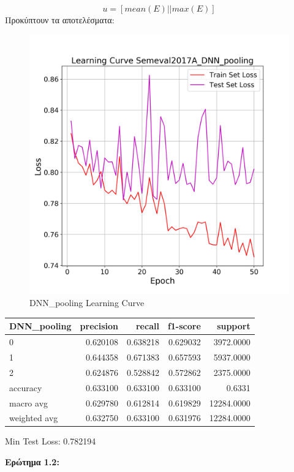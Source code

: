 \documentclass[12pt]{article}
\begin{document}
$$ u = [mean(E)||max(E)]$$
Προκύπτουν τα αποτελέσματα:

\begin{figure}[h!]
	\centering
	\includegraphics[width=0.6\linewidth]{./img/Semeval2017A/DNN_pooling_loss.png}
	\caption{DNN\_pooling Learning Curve}
	\label{fig:sin}
\end{figure}

\begin{tabular}{lrrrr}
\toprule
DNN\_pooling &  precision &    recall &  f1-score &     support \\
\midrule
0            &   0.620108 &  0.638218 &  0.629032 &   3972.0000 \\
1            &   0.644358 &  0.671383 &  0.657593 &   5937.0000 \\
2            &   0.624876 &  0.528842 &  0.572862 &   2375.0000 \\
accuracy     &   0.633100 &  0.633100 &  0.633100 &      0.6331 \\
macro avg    &   0.629780 &  0.612814 &  0.619829 &  12284.0000 \\
weighted avg &   0.632750 &  0.633100 &  0.631976 &  12284.0000 \\
\bottomrule
\end{tabular}

Min Test Loss: 0.782194



\textbf{Ερώτημα 1.2:}
\end{document}
